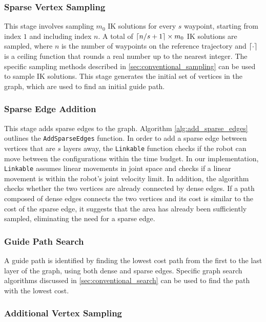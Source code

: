 \subsubsection{Sparse Vertex Sampling} \label{sec: sparse_sampling}

This stage involves sampling $m_0$ IK solutions for every $s$ waypoint, starting from index $1$ and including index $n$.
{A total of $\lceil n/s + 1\rceil \times m_0$ IK solutions are sampled, where $n$ is the number of waypoints on the reference trajectory and $\lceil\cdot\rceil$ is a ceiling function that rounds a real number up to the nearest integer.}
The specific sampling methods described in \cref{sec:conventional_sampling} can be used to sample IK solutions. 
This stage generates the initial set of vertices in the graph, which are used to find an initial guide path.


\subsubsection{Sparse Edge Addition}
This stage adds sparse edges to the graph.
Algorithm \ref{alg:add_sparse_edges} outlines the {\small\texttt{AddSparseEdges}} function.
In order to add a sparse edge between vertices that are $s$ layers away, the {\small\texttt{Linkable}} function checks if the robot can move between the configurations within the time budget.  
In our implementation, {\small\texttt{Linkable}} assumes linear movements in joint space and checks if a linear movement is within the robot's joint velocity limit. 
In addition, the algorithm checks whether the two vertices are already connected by dense edges. If a path composed of dense edges connects the two vertices and its cost is similar to the cost of the sparse edge, it suggests that the area has already been sufficiently sampled, eliminating the need for a sparse edge.




\subsubsection{Guide Path Search} A guide path is identified by finding the lowest cost path from the first to the last layer of the graph, using both dense and sparse edges. Specific graph search algorithms discussed in \cref{sec:conventional_search} can be used to find the path with the lowest cost. 



\subsubsection{Additional Vertex Sampling}

